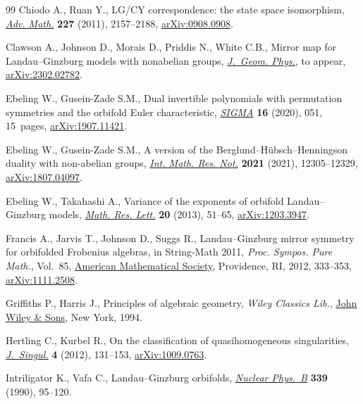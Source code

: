 \documentclass[pdftex]{sigma}
\numberwithin{equation}{section}
\begin{document}
\begin{thebibliography}{99}
Chiodo A., Ruan Y., L{G}/{CY} correspondence: the state space isomorphism,
 \href{https://doi.org/10.1016/j.aim.2011.04.011}{\textit{Adv. Math.}} \textbf{227} (2011), 2157--2188, \href{https://arxiv.org/abs/0908.0908}{arXiv:0908.0908}.

Clawson A., Johnson D., Morais D., Priddis N., White C.B., Mirror map for
 {L}andau--{G}inzburg models with nonabelian groups, \href{https://doi.org/10.1016/j.geomphys.2024.105161}{\textit{J.~Geom. Phys.}},
 {t}o appear, \href{https://arxiv.org/abs/2302.02782}{arXiv:2302.02782}.

Ebeling W., Gusein-Zade S.M., Dual invertible polynomials with permutation
 symmetries and the orbifold {E}uler characteristic, \href{https://doi.org/10.3842/SIGMA.2020.051}{\textit{SIGMA}}
 \textbf{16} (2020), 051, 15~pages, \href{https://arxiv.org/abs/1907.11421}{arXiv:1907.11421}.

Ebeling W., Gusein-Zade S.M., A version of the
 {B}erglund--{H}\"ubsch--{H}enningson duality with non-abelian groups,
 \href{https://doi.org/10.1093/imrn/rnz167}{\textit{Int. Math. Res. Not.}} \textbf{2021} (2021), 12305--12329,
 \href{https://arxiv.org/abs/1807.04097}{arXiv:1807.04097}.

Ebeling W., Takahashi A., Variance of the exponents of orbifold
 {L}andau--{G}inzburg models, \href{https://doi.org/10.4310/MRL.2013.v20.n1.a5}{\textit{Math. Res. Lett.}} \textbf{20} (2013),
 51--65, \href{https://arxiv.org/abs/1203.3947}{arXiv:1203.3947}.

Francis A., Jarvis T., Johnson D., Suggs R., Landau--{G}inzburg mirror symmetry
 for orbifolded {F}robenius algebras, in String-{M}ath 2011, \textit{Proc.
 Sympos. Pure Math.}, Vol.~85, \href{https://doi.org/10.1090/pspum/085/1389}{American Mathematical Society}, Providence, RI,
 2012, 333--353, \href{https://arxiv.org/abs/1111.2508}{arXiv:1111.2508}.

Griffiths P., Harris J., Principles of algebraic geometry, \textit{Wiley Classics Lib.},
 \href{https://doi.org/10.1002/9781118032527}{John Wiley \& Sons}, New York, 1994.

Hertling C., Kurbel R., On the classification of quasihomogeneous
 singularities, \href{https://doi.org/10.5427/jsing.2012.4h}{\textit{J.~Singul.}} \textbf{4} (2012), 131--153,
 \href{https://arxiv.org/abs/1009.0763}{arXiv:1009.0763}.

Intriligator K., Vafa C., Landau--{G}inzburg orbifolds, \href{https://doi.org/10.1016/0550-3213(90)90535-L}{\textit{Nuclear
 Phys.~B}} \textbf{339} (1990), 95--120.


\end{thebibliography}
\end{document}
